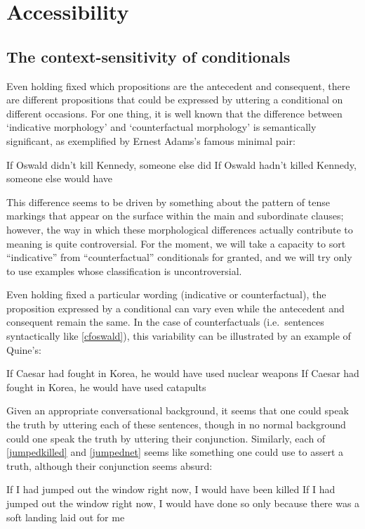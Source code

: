 \documentclass[If.tex]{subfiles}
\begin{document}
 
\chapter{Accessibility}\label{chap:accessibility}
\section{The context-sensitivity of conditionals} \label{sect:context}
Even holding fixed which propositions are the antecedent and consequent, there are different propositions that could be expressed by uttering a conditional on different occasions. For one thing, it is well known that the difference between ‘indicative morphology’ and ‘counterfactual morphology’ is semantically significant, as exemplified by Ernest Adams's famous minimal pair:
\begin{prop}
	\nitem	
	\begin{prop}
		\aitem \label{indoswald}
			If Oswald didn't kill Kennedy, someone else did
		\aitem \label{cfoswald}
			If Oswald hadn't killed Kennedy, someone else would have
	\end{prop}
\end{prop}
This difference seems to be driven by something about the pattern of tense markings that appear on the surface within the main and subordinate clauses; however, the way in which these morphological differences actually contribute to meaning is quite controversial. For the moment, we will take a capacity to sort “indicative” from “counterfactual” conditionals for granted, and we will try only to use examples whose classification is uncontroversial.

Even holding fixed a particular wording (indicative or counterfactual), the proposition expressed by a conditional can vary even while the antecedent and consequent remain the same. In the case of counterfactuals (i.e.~sentences syntactically like \ref{cfoswald}), this variability can be illustrated by an example of Quine's:
\begin{prop}
	\nitem
	\begin{prop}
		\aitem \label{nukes}
			If Caesar had fought in Korea, he would have used nuclear weapons
		\aitem \label{catapults}
			If Caesar had fought in Korea, he would have used catapults
	\end{prop}
\end{prop}
Given an appropriate conversational background, it seems that one could speak the truth by uttering each of these sentences, though in no normal background could one speak the truth by uttering their conjunction. Similarly, each of \ref{jumpedkilled} and \ref{jumpednet} \citep{JacksonCTC} seems like something one could use to assert a truth, although their conjunction seems absurd:
\begin{prop}
	\nitem	
	\begin{prop}
		\aitem \label{jumpedkilled}
		If I had jumped out the window right now, I would have been killed
		\aitem \label{jumpednet}
		If I had jumped out the window right now, I would have done so only because there was a soft landing laid out for me
	\end{prop}
\end{prop}
\end{document}

